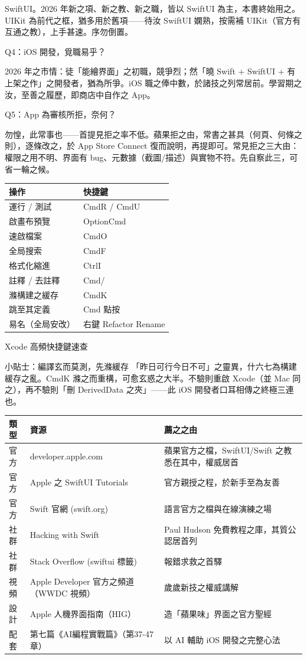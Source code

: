SwiftUI。2026 年新之項、新之教、新之職，皆以 SwiftUI 為主，本書終始用之。UIKit 為前代之框，猶多用於舊項——待汝 SwiftUI 嫻熟，按需補 UIKit（官方有互通之教），上手甚速。序勿倒置。

Q4：iOS 開發，覓職易乎？

2026 年之市情：徒「能繪界面」之初職，競爭烈；然「曉 Swift + SwiftUI + 有上架之作」之開發者，猶為所爭。iOS 職之俸中數，於諸技之列常居前。學習期之汝，至善之履歷，即商店中自作之 App。

Q5：App 為審核所拒，奈何？

勿惶，此常事也——首提見拒之率不低。蘋果拒之由，常書之甚具（何頁、何條之則），逐條改之，於 App Store Connect 復而說明，再提即可。常見拒之三大由：權限之用不明、界面有 bug、元數據（截圖/描述）與實物不符。先自察此三，可省一輪之候。


\begin{center}
\begin{tabularx}{\linewidth}{|X|X|}
\hline
\textbf{操作} & \textbf{快捷鍵} \tabularnewline
\hline
運行 / 測試 & CmdR / CmdU \tabularnewline
啟畫布預覽 & OptionCmd \tabularnewline
速啟檔案 & CmdO \tabularnewline
全局搜索 & CmdF \tabularnewline
格式化縮進 & CtrlI \tabularnewline
註釋 / 去註釋 & Cmd/ \tabularnewline
滌構建之緩存 & CmdK \tabularnewline
跳至其定義 & Cmd 點按 \tabularnewline
易名（全局安改） & 右鍵 Refactor Rename \tabularnewline
\hline
\end{tabularx}
\end{center}

\begin{center}\small\color{gray}Xcode 高頻快捷鍵速查\end{center}

\begin{tcbinfo}{小貼士：編譯玄而莫測，先滌緩存}
「昨日可行今日不可」之靈異，什六七為構建緩存之亂。CmdK 滌之而重構，可愈玄惑之大半。不驗則重啟 Xcode（並 Mac 同之），再不驗則「刪 DerivedData 之夾」——此 iOS 開發者口耳相傳之終極三連也。

\end{tcbinfo}



\begin{center}
\begin{tabularx}{\linewidth}{|X|X|X|}
\hline
\textbf{類型} & \textbf{資源} & \textbf{薦之之由} \tabularnewline
\hline
官方 & developer.apple.com & 蘋果官方之檔，SwiftUI/Swift 之教悉在其中，權威居首 \tabularnewline
官方 & Apple 之 SwiftUI Tutorials & 官方親授之程，於新手至為友善 \tabularnewline
官方 & Swift 官網 (swift.org) & 語言官方之檔與在線演練之場 \tabularnewline
社群 & Hacking with Swift & Paul Hudson 免費教程之庫，其質公認居首列 \tabularnewline
社群 & Stack Overflow (swiftui 標籤) & 報錯求救之首驛 \tabularnewline
視頻 & Apple Developer 官方之頻道（WWDC 視頻） & 歲歲新技之權威講解 \tabularnewline
設計 & Apple 人機界面指南（HIG） & 造「蘋果味」界面之官方聖經 \tabularnewline
配套 & 第七篇《AI編程實戰篇》（第37-47章） & 以 AI 輔助 iOS 開發之完整心法 \tabularnewline
\hline
\end{tabularx}
\end{center}

